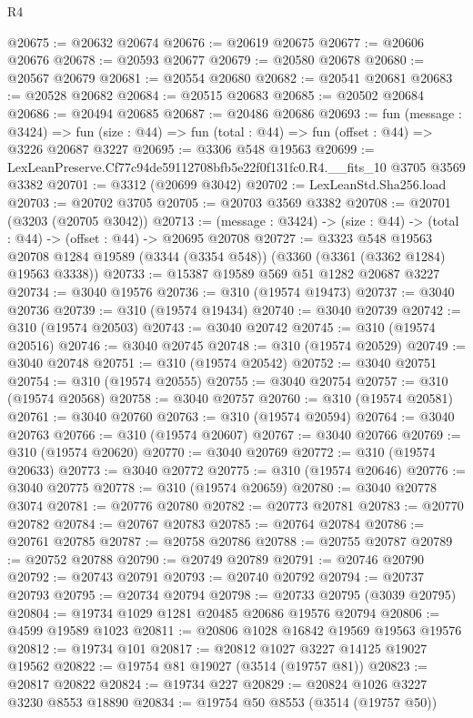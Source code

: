 \begin{lexlean}{R4}
\begin{coremodule}
@20675 := @20632 @20674
@20676 := @20619 @20675
@20677 := @20606 @20676
@20678 := @20593 @20677
@20679 := @20580 @20678
@20680 := @20567 @20679
@20681 := @20554 @20680
@20682 := @20541 @20681
@20683 := @20528 @20682
@20684 := @20515 @20683
@20685 := @20502 @20684
@20686 := @20494 @20685
@20687 := @20486 @20686
@20693 := fun (message : @3424) =>
  fun (size : @44) => fun (total : @44) => fun (offset : @44) => @3226 @20687 @3227
@20695 := @3306 @548 @19563
@20699 := LexLeanPreserve.Cf77c94de59112708bfb5e22f0f131fc0.R4.__fits_10 @3705 @3569 @3382
@20701 := @3312 (@20699 @3042)
@20702 := LexLeanStd.Sha256.load
@20703 := @20702 @3705
@20705 := @20703 @3569 @3382
@20708 := @20701 (@3203 (@20705 @3042))
@20713 := (message : @3424) -> (size : @44) -> (total : @44) -> (offset : @44) -> @20695 @20708
@20727 := @3323
    @548
    @19563
    @20708
    @1284
    @19589
    (@3344 (@3354 @548))
    (@3360 (@3361 (@3362 @1284) @19563 @3338))
@20733 := @15387 @19589 @569 @51 @1282 @20687 @3227
@20734 := @3040 @19576
@20736 := @310 (@19574 @19473)
@20737 := @3040 @20736
@20739 := @310 (@19574 @19434)
@20740 := @3040 @20739
@20742 := @310 (@19574 @20503)
@20743 := @3040 @20742
@20745 := @310 (@19574 @20516)
@20746 := @3040 @20745
@20748 := @310 (@19574 @20529)
@20749 := @3040 @20748
@20751 := @310 (@19574 @20542)
@20752 := @3040 @20751
@20754 := @310 (@19574 @20555)
@20755 := @3040 @20754
@20757 := @310 (@19574 @20568)
@20758 := @3040 @20757
@20760 := @310 (@19574 @20581)
@20761 := @3040 @20760
@20763 := @310 (@19574 @20594)
@20764 := @3040 @20763
@20766 := @310 (@19574 @20607)
@20767 := @3040 @20766
@20769 := @310 (@19574 @20620)
@20770 := @3040 @20769
@20772 := @310 (@19574 @20633)
@20773 := @3040 @20772
@20775 := @310 (@19574 @20646)
@20776 := @3040 @20775
@20778 := @310 (@19574 @20659)
@20780 := @3040 @20778 @3074
@20781 := @20776 @20780
@20782 := @20773 @20781
@20783 := @20770 @20782
@20784 := @20767 @20783
@20785 := @20764 @20784
@20786 := @20761 @20785
@20787 := @20758 @20786
@20788 := @20755 @20787
@20789 := @20752 @20788
@20790 := @20749 @20789
@20791 := @20746 @20790
@20792 := @20743 @20791
@20793 := @20740 @20792
@20794 := @20737 @20793
@20795 := @20734 @20794
@20798 := @20733 @20795 (@3039 @20795)
@20804 := @19734 @1029 @1281 @20485 @20686 @19576 @20794
@20806 := @4599 @19589 @1023
@20811 := @20806 @1028 @16842 @19569 @19563 @19576
@20812 := @19734 @101
@20817 := @20812 @1027 @3227 @14125 @19027 @19562
@20822 := @19754 @81 @19027 (@3514 (@19757 @81))
@20823 := @20817 @20822
@20824 := @19734 @227
@20829 := @20824 @1026 @3227 @3230 @8553 @18890
@20834 := @19754 @50 @8553 (@3514 (@19757 @50))

\end{coremodule}
\end{lexlean}
